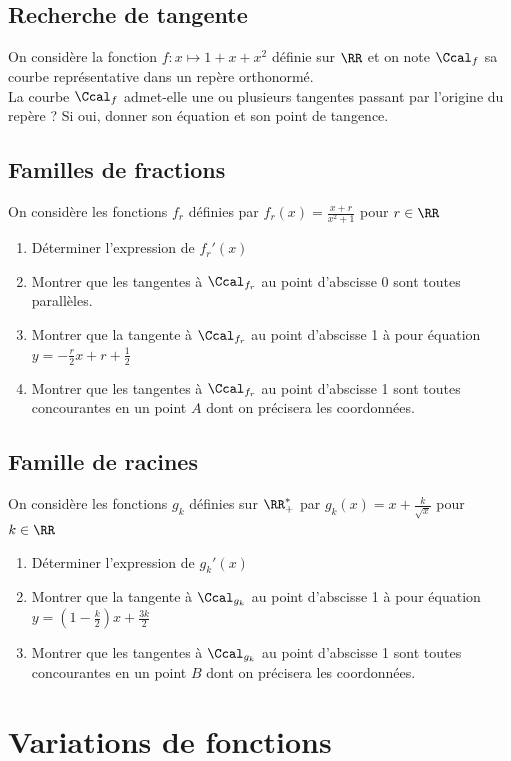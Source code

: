 \documentclass[oneside,12pt]{book}          %
\begin{document}
\subsection{Recherche de tangente}
On considère la fonction $f:x\mapsto1+x+x^2$ définie sur $\RR$ et on note $\Ccal_f$ sa courbe représentative dans un repère orthonormé.\\
La courbe $\Ccal_f$ admet-elle une ou plusieurs tangentes passant par l'origine du repère ? Si  oui, donner son équation et son point de tangence.


\subsection{Familles de fractions}
On considère les fonctions $f_r$ définies par $f_r(x)=\frac{x+r}{x^2+1}$ pour $r\in\RR$
    \begin{enumerate}
        \item Déterminer l'expression de $f_r'(x)$
        \item Montrer que les tangentes à $\Ccal_{f_r}$ au point d'abscisse 0 sont toutes parallèles.
        \item Montrer que la tangente à $\Ccal_{f_r}$ au point d'abscisse 1 à pour équation $y=-\frac{r}{2}x+r+\frac{1}{2}$
        \item Montrer que les tangentes à $\Ccal_{f_r}$ au point d'abscisse 1 sont toutes concourantes en un point $A$ dont on précisera les coordonnées.
    \end{enumerate}



\subsection{Famille de racines}
On considère les fonctions $g_k$ définies sur $\RR_+^*$ par $g_k(x)=x+\frac{k}{\sqrt{x}}$ pour $k\in\RR$
    \begin{enumerate}
        \item Déterminer l'expression de $g_k'(x)$
        \item Montrer que la tangente à $\Ccal_{g_k}$ au point d'abscisse 1 à pour équation $y=(1-\frac{k}{2})x+\frac{3k}{2}$
        \item Montrer que les tangentes à $\Ccal_{g_k}$ au point d'abscisse 1 sont toutes concourantes en un point $B$ dont on précisera les coordonnées.
    \end{enumerate}




\section{Variations de fonctions}
\end{document}
